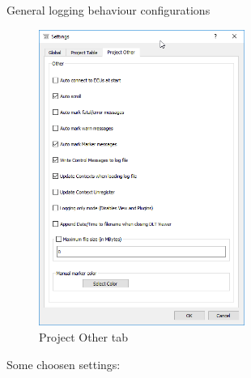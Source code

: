 \documentclass[a4paper,11pt]{article}
\begin{document}
General logging behaviour configurations

\begin{figure}[H]
 \centering
 \includegraphics[width=0.6\textwidth]{images/settings_other.png}
 \caption{Project Other tab}
 \label{fig:projectotherab}
\end{figure}

Some choosen settings:
\end{document}

